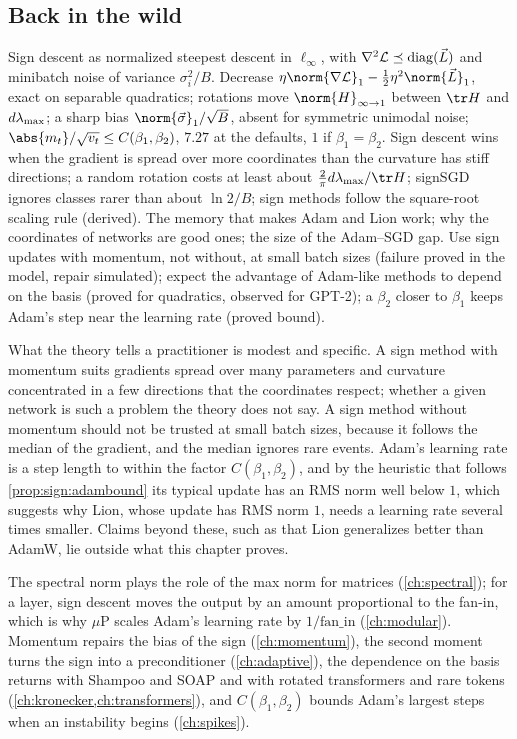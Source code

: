 \begin{refsection}
\section{Back in the wild}\label{sec:sign:back}

{Sign descent as normalized steepest descent in $\ell_\infty$, with $\nabla^2\mathcal{L}\preceq\operatorname{diag}(\vec L)$ and minibatch noise of variance $\sigma_i^2/B$.}
{Decrease $\eta\norm{\nabla\Loss}_1-\frac12\eta^2\norm{\vec L}_1$, exact on separable quadratics; rotations move $\norm{H}_{\infty\to1}$ between $\tr H$ and $d\lambda_{\max}$; a sharp bias $\norm{\vec\sigma}_1/\sqrt B$, absent for symmetric unimodal noise; $\abs{m_t}/\sqrt{v_t}\le C(\beta_1,\beta_2)$, $7.27$ at the defaults, $1$ if $\beta_1=\beta_2$.}
{Sign descent wins when the gradient is spread over more coordinates than the curvature has stiff directions; a random rotation costs at least about $\frac2\pi d\lmax/\tr H$; signSGD ignores classes rarer than about $\ln2/B$; sign methods follow the square-root scaling rule (derived).}
{The memory that makes Adam and Lion work; why the coordinates of networks are good ones; the size of the Adam--SGD gap.}
{Use sign updates with momentum, not without, at small batch sizes (failure proved in the model, repair simulated); expect the advantage of Adam-like methods to depend on the basis (proved for quadratics, observed for GPT-2); a $\beta_2$ closer to $\beta_1$ keeps Adam's step near the learning rate (proved bound).}

What the theory tells a practitioner is modest and specific. A sign method with momentum suits gradients spread over many parameters and curvature concentrated in a few directions that the coordinates respect; whether a given network is such a problem the theory does not say. A sign method without momentum should not be trusted at small batch sizes, because it follows the median of the gradient, and the median ignores rare events. Adam's learning rate is a step length to within the factor $C(\beta_1,\beta_2)$, and by the heuristic that follows \cref{prop:sign:adambound} its typical update has an RMS norm well below $1$, which suggests why Lion, whose update has RMS norm $1$, needs a learning rate several times smaller. Claims beyond these, such as that Lion generalizes better than AdamW, lie outside what this chapter proves.

The spectral norm plays the role of the max norm for matrices (\cref{ch:spectral}); for a layer, sign descent moves the output by an amount proportional to the fan-in, which is why $\mu$P scales Adam's learning rate by $1/\mathrm{fan\_in}$ (\cref{ch:modular}). Momentum repairs the bias of the sign (\cref{ch:momentum}), the second moment turns the sign into a preconditioner (\cref{ch:adaptive}), the dependence on the basis returns with Shampoo and SOAP and with rotated transformers and rare tokens (\cref{ch:kronecker,ch:transformers}), and $C(\beta_1,\beta_2)$ bounds Adam's largest steps when an instability begins (\cref{ch:spikes}).


\end{refsection}
